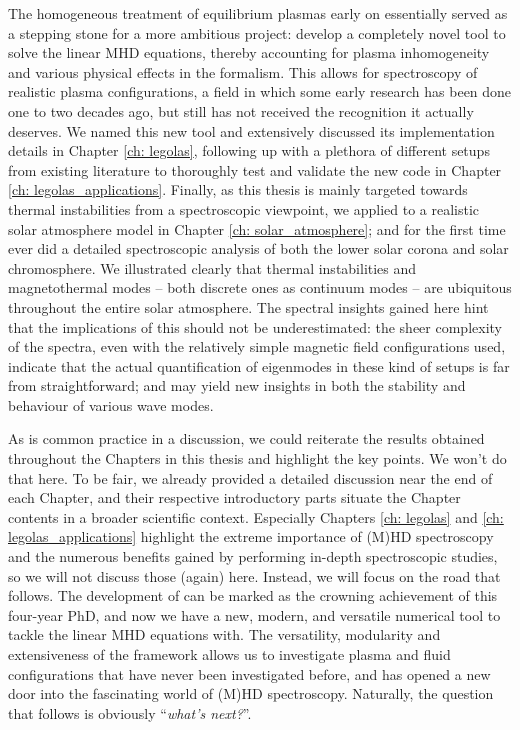 The homogeneous treatment of equilibrium plasmas early on essentially served as a stepping stone for a more ambitious project: develop a completely novel tool to solve the linear MHD equations, thereby accounting for plasma inhomogeneity and various physical effects in the formalism. This allows for spectroscopy of realistic plasma configurations, a field in which some early research has been done one to two decades ago, but still has not received the recognition it actually deserves. We named this new tool {\legolas} and extensively discussed its implementation details in Chapter \ref{ch: legolas}, following up with a plethora of different setups from existing literature to thoroughly test and validate the new code in Chapter \ref{ch: legolas_applications}. Finally, as this thesis is mainly targeted towards thermal instabilities from a spectroscopic viewpoint, we applied {\legolas} to a realistic solar atmosphere model in Chapter \ref{ch: solar_atmosphere}; and for the first time ever did a detailed spectroscopic analysis of both the lower solar corona and solar chromosphere. We illustrated clearly that thermal instabilities and magnetothermal modes -- both discrete ones as continuum modes -- are ubiquitous throughout the entire solar atmosphere. The spectral insights gained here hint that the implications of this should not be underestimated: the sheer complexity of the spectra, even with the relatively simple magnetic field configurations used, indicate that the actual quantification of eigenmodes in these kind of setups is far from straightforward; and may yield new insights in both the stability and behaviour of various wave modes.

As is common practice in a discussion, we could reiterate the results obtained throughout the Chapters in this thesis and highlight the key points. We won't do that here. To be fair, we already provided a detailed discussion near the end of each Chapter, and their respective introductory parts situate the Chapter contents in a broader scientific context. Especially Chapters \ref{ch: legolas} and \ref{ch: legolas_applications} highlight the extreme importance of (M)HD spectroscopy and the numerous benefits gained by performing in-depth spectroscopic studies, so we will not discuss those (again) here. Instead, we will focus on the road that follows. The development of {\legolas} can be marked as the crowning achievement of this four-year PhD, and now we have a new, modern, and versatile numerical tool to tackle the linear MHD equations with. The versatility, modularity and extensiveness of the {\legolas} framework allows us to investigate plasma and fluid configurations that have never been investigated before, and has opened a new door into the fascinating world of (M)HD spectroscopy. Naturally, the question that follows is obviously ``\emph{what's next?}''.

